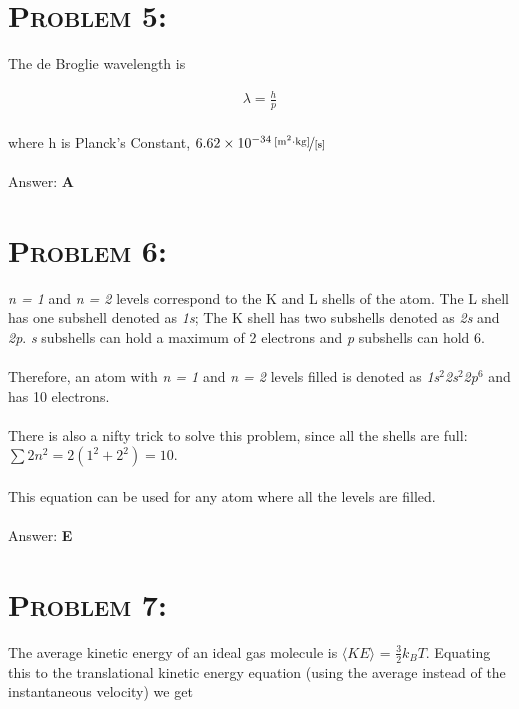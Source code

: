 \documentclass{article}
\providecommand{\e}[1]{\ensuremath{\times 10^{#1}}}
\begin{document}

\section{\textsc{Problem 5:}}  The de Broglie wavelength is

\begin{align}
\lambda = \frac{h}{p}
\end{align}
\\
where h is Planck's Constant, $\unitfrac[6.62\e{-34}]{[m^2 \cdot kg]}{[s]}$
\\\\
Answer: \textbf{\textcolor{ProcessBlue}A}\\


\section{\textsc{Problem 6:}}  \textit{n = 1} and \textit{n = 2} levels correspond to the K and L shells of the atom. The L shell has one subshell denoted as \textit{1s}; The K shell has two subshells denoted as \textit{2s} and \textit{2p}. \textit{s} subshells can hold a maximum of 2 electrons and \textit{p} subshells can hold 6.\\\\Therefore, an atom with \textit{n = 1} and \textit{n = 2} levels filled is denoted as \textit{1s$^2$2s$^2$2p$^6$} and has 10 electrons.\\\\
There is also a nifty trick to solve this problem, since all the shells are full: $\sum2n^{2} = 2(1^{2}+2^{2}) = 10$. \\\\This equation can be used for any atom where all the levels are filled.
\\\\
Answer: \textbf{\textcolor{ProcessBlue}E}\\


\section{\textsc{Problem 7:}}  The average kinetic energy of an ideal gas molecule is $\langle{KE}\rangle$ = $\frac{3}{2} k_B T$. Equating this to the translational kinetic energy equation (using the average instead of the instantaneous velocity) we get
\end{document}
